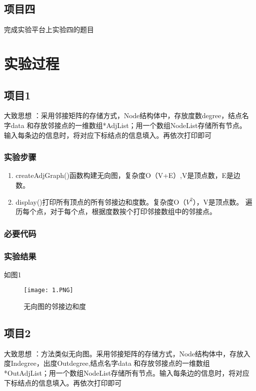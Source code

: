 \subsection{项目四}
完成实验平台上实验四的题目

\section{实验过程}
\subsection{项目1}
大致思想 ：采用邻接矩阵的存储方式，Node结构体中，存放度数degree，结点名字data 和存放邻接点的一维数组*AdjList；用一个数组NodeList存储所有节点。输入每条边的信息时，将对应下标结点的信息填入。再依次打印即可
\subsubsection{实验步骤}
\begin{enumerate}
\item createAdjGraph()函数构建无向图，复杂度O（V+E）,V是顶点数，E是边数。
\item display()打印所有顶点的所有邻接边和度数。复杂度O（$V^2$），V是顶点数。       遍历每个点，对于每个点，根据度数挨个打印邻接数组中的邻接点。
\end{enumerate}

\subsubsection{必要代码}


\subsubsection{实验结果}如图1
	\begin{figure}[!bthp]
	\centering
        \texttt{[image: 1.PNG]}
        \caption{无向图的邻接边和度}
      \end{figure}

\subsection{项目2}
大致思想 ：方法类似无向图。采用邻接矩阵的存储方式，Node结构体中，存放入度Indegree，出度Outdegree,结点名字data 和存放邻接点的一维数组*OutAdjList；用一个数组NodeList存储所有节点。输入每条边的信息时，将对应下标结点的信息填入。再依次打印即可
